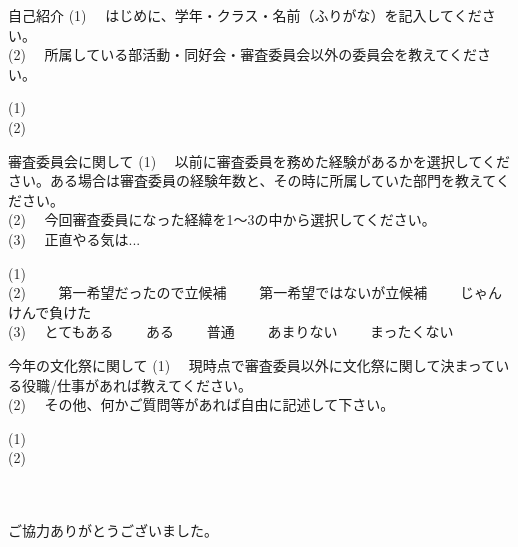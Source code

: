 \documentclass[paper=b4j, landscape, fleqn, jafontsize=9pt, jafontscale=1, head_space=25.5mm, foot_space=15mm, fore-edge=14.5mm, gutter=14.5mm, hanging_punctuation, baselineskip=7mm]{jlreq}
\begin{document}
\begin{answersheet}
\begin{center}
    {\selectsize{15pt}{15pt}}
    \vskip3mm
\end{center}

\begin{question}{自己紹介}
\noindent (1)~~ はじめに、学年・クラス・名前（ふりがな）を記入してください。\\
\noindent (2)~~ 所属している部活動・同好会・審査委員会以外の委員会を教えてください。
\end{question}

\noindent (1)~~ \\
\noindent (2)~~ \kasen{}\\

\begin{question}{審査委員会に関して}
\noindent (1)~~ 以前に審査委員を務めた経験があるかを選択してください。ある場合は審査委員の経験年数と、その時に所属していた部門を教えてください。\\
\noindent (2)~~ 今回審査委員になった経緯を1〜3の中から選択してください。\\
\noindent (3)~~ 正直やる気は...
\end{question}

\noindent (1)~~ \\
\noindent (2)~~\hspace{1.5\zw} 　第一希望だったので立候補　　 第一希望ではないが立候補　　 じゃんけんで負けた\\
\noindent (3)~~\hspace{1.5\zw} とてもある　　 ある　　 普通　　 あまりない　　 まったくない\\
    
\begin{question}{今年の文化祭に関して}
\noindent (1)~~ 現時点で審査委員以外に文化祭に関して決まっている役職/仕事があれば教えてください。\\
\noindent (2)~~ その他、何かご質問等があれば自由に記述して下さい。
\end{question}

\noindent (1)~~ \kasen{}\\
\noindent (2)~~ \kasen{}\\~~~~~~~\kasen{}\\~~~~~~~\kasen{}\\
\begin{flushright}
    ご協力ありがとうございました。
\end{flushright}
\end{answersheet}
\end{document}
